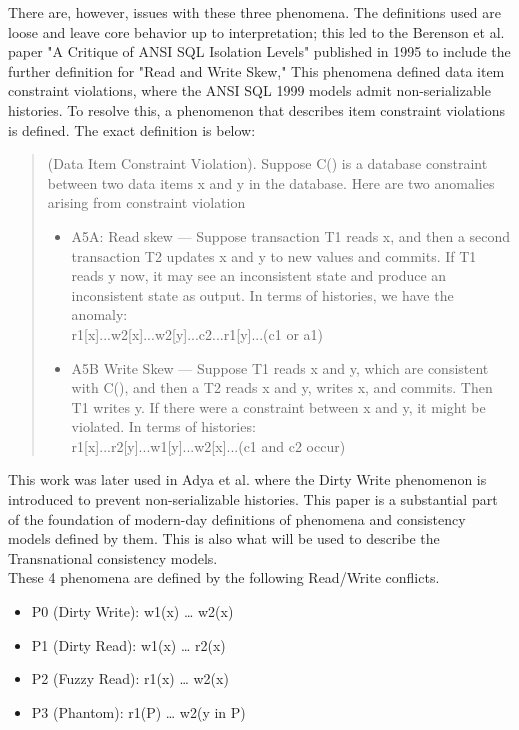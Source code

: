 \documentclass[a4paper,10pt,titlepage]{report}
\begin{document}
There are, however, issues with these three phenomena. The definitions used are loose and leave core behavior up to interpretation; this led to the Berenson et al. \cite{Berensonetal} paper "A Critique of ANSI SQL Isolation Levels" published in 1995 to include the further definition for "Read and Write Skew," This phenomena defined data item constraint violations, where the ANSI SQL 1999 \cite{ansisql1999} models admit non-serializable histories. To resolve this, a phenomenon that describes item constraint violations is defined. The exact definition is below: \\
\begin{quote}
    (Data Item Constraint Violation). Suppose C() is a database constraint between two data items x and y in the database. Here are two anomalies arising from constraint violation
\begin{itemize}
\item A5A: Read skew — Suppose transaction T1 reads x, and then a second transaction T2 updates x and y to new values and commits. If T1 reads y now, it may see an inconsistent state and produce an inconsistent state as output.
In terms of histories, we have the anomaly:   \\
 r1[x]...w2[x]...w2[y]...c2...r1[y]...(c1 or a1)
 
\item A5B Write Skew — Suppose T1 reads x and y, which are
consistent with C(), and then a T2 reads x and y, writes x,
    and commits. Then T1 writes y. If there were a constraint
    between x and y, it might be violated. In terms of histories: \\
r1[x]...r2[y]...w1[y]...w2[x]...(c1 and c2 occur)
    
\end{itemize}
\end{quote}

This work was later used in Adya et al. \cite{Adya99weakconsistency} where the Dirty Write phenomenon is introduced to prevent non-serializable histories. This paper is a substantial part of the foundation of modern-day definitions of phenomena and consistency models defined by them. This is also what will be used to describe the Transnational consistency models.\\

These 4 phenomena are defined by the following Read/Write conflicts.
\begin{itemize}
    \item P0 (Dirty Write): w1(x) … w2(x)
    \item P1 (Dirty Read): w1(x) … r2(x)
    \item P2 (Fuzzy Read): r1(x) … w2(x)
    \item P3 (Phantom): r1(P) … w2(y in P)
\end{itemize}
\end{document}
